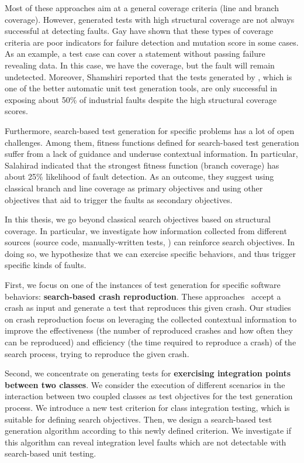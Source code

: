 Most of these approaches aim at a general coverage criteria (\eg line and branch coverage). However,  generated tests with high structural coverage are not always successful at detecting faults. Gay \etal \cite{gay2015risks} have shown that these types of coverage criteria are poor indicators for failure detection and mutation score in some cases. As an example, a test case can cover a statement without passing failure revealing data. In this case, we have the coverage, but the fault will remain undetected.
Moreover, Shamshiri \etal \cite{Shamshiri2016} reported that the tests generated by \evosuite, which is one of the better automatic unit test generation tools, are only successful in exposing about 50\% of industrial faults despite the high structural coverage scores. 

Furthermore, search-based test generation for specific problems has a lot of open challenges. Among them, fitness functions defined for search-based test generation suffer from a lack of guidance and underuse contextual information.  
In particular, Salahirad \etal \cite{Salahirad2019} indicated that the strongest fitness function (branch coverage) has about 25\% likelihood of fault detection.
As an outcome, they suggest using classical branch and line coverage as primary objectives and using other objectives that aid to trigger the faults as secondary objectives.

In this thesis, we go beyond classical search objectives based on structural coverage. In particular, we investigate how information collected from different sources (\ie source code, manually-written tests, \etc) can reinforce search objectives. In doing so, we hypothesize that we can exercise specific behaviors, and thus trigger specific kinds of faults.


First, we focus on one of the instances of test generation for specific software behaviors: \textbf{search-based crash reproduction}. These approaches~\cite{Soltani2018a, BPT17concrash, Chen2015, Nayrolles2017, Rossler2013, Xuan2015} accept a crash as input and generate a test that reproduces this given crash. Our studies on crash reproduction focus on leveraging the collected contextual information to improve the effectiveness (\ie the number of reproduced crashes and how often they can be reproduced) and efficiency (\ie the time required to reproduce a crash) of the search process, trying to reproduce the given crash.

Second, we concentrate on generating tests for \textbf{exercising integration points between two classes}. We consider the execution of different scenarios in the interaction between two coupled classes as test objectives for the test generation process. We introduce a new test criterion for class integration testing, which is suitable for defining search objectives. Then, we design a search-based test generation algorithm according to this newly defined criterion. We investigate if this algorithm can reveal integration level faults which are not detectable with search-based unit testing.

